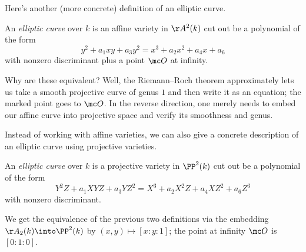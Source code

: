 \documentclass[../notes.tex]{subfiles}
\begin{document}
Here's another (more concrete) definition of an elliptic curve.
\begin{definition}
	An \textit{elliptic curve} over $k$ is an affine variety in $\AA^2(k)$ cut out be a polynomial of the form
	\[y^2+a_1xy+a_3y^2=x^3+a_2x^2+a_4x+a_6\]
	with nonzero discriminant plus a point $\mc O$ at infinity.
\end{definition}
\begin{remark}
	Why are these equivalent? Well, the Riemann--Roch theorem approximately lets us take a smooth projective curve of genus $1$ and then write it as an equation; the marked point goes to $\mc O$. In the reverse direction, one merely needs to embed our affine curve into projective space and verify its smoothness and genus.
\end{remark}
Instead of working with affine varieties, we can also give a concrete description of an elliptic curve using projective varieties.
\begin{definition}
	An \textit{elliptic curve} over $k$ is a projective variety in $\PP^2(k)$ cut out be a polynomial of the form
	\[Y^2Z+a_1XYZ+a_3YZ^2=X^3+a_2X^2Z+a_4XZ^2+a_6Z^3\]
	with nonzero discriminant.
\end{definition}
We get the equivalence of the previous two definitions via the embedding $\AA_2(k)\into\PP^2(k)$ by $(x,y)\mapsto[x:y:1]$; the point at infinity $\mc O$ is $[0:1:0]$.
\end{document}
